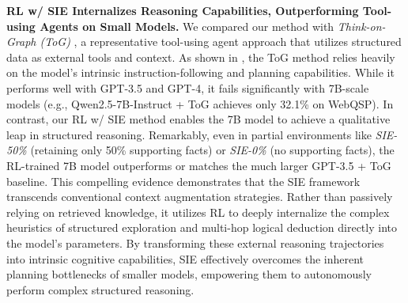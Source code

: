 \documentclass{article} %
\begin{document}
\textbf{RL w/ SIE Internalizes Reasoning Capabilities, Outperforming Tool-using Agents on Small Models.}
We compared our method with \textit{Think-on-Graph (ToG)} \citep{sun2023think}, a representative tool-using agent approach that utilizes structured data as external tools and context.
As shown in , the ToG method relies heavily on the model's intrinsic instruction-following and planning capabilities. While it performs well with GPT-3.5 and GPT-4, it fails significantly with 7B-scale models (e.g., Qwen2.5-7B-Instruct + ToG achieves only 32.1\% on WebQSP).
In contrast, our RL w/ SIE method enables the 7B model to achieve a qualitative leap in structured reasoning. Remarkably, even in partial environments like \textit{SIE-50\%} (retaining only 50\% supporting facts) or \textit{SIE-0\%} (no supporting facts), the RL-trained 7B model outperforms or matches the much larger GPT-3.5 + ToG baseline.
This compelling evidence demonstrates that the SIE framework transcends conventional context augmentation strategies. Rather than passively relying on retrieved knowledge, it utilizes RL to deeply internalize the complex heuristics of structured exploration and multi-hop logical deduction directly into the model's parameters. By transforming these external reasoning trajectories into intrinsic cognitive capabilities, SIE effectively overcomes the inherent planning bottlenecks of smaller models, empowering them to autonomously perform complex structured reasoning.


\begin{table}[!t]
\centering
\caption{Comparison with Tool-using Agents. The results for GPT-3.5+ToG and GPT-4+ToG are taken from the original ToG paper. RL w/ SIE significantly outperforms the ToG agent on 7B models and matches GPT-3.5+ToG performance even under information-limited partial SIEs.}
\vspace{5pt}
\label{tab:tog_comparison}
\end{table}
\end{document}
